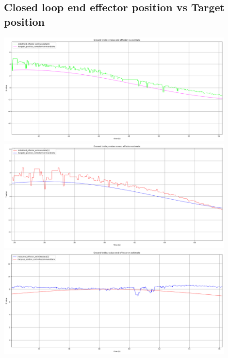 \subsection{Closed loop end effector position vs Target position}
\includegraphics[width=0.9\textwidth]{plots/closed_x.png} \\
\includegraphics[width=0.9\textwidth]{plots/closed_y.png} \\
\includegraphics[width=0.9\textwidth]{plots/closed_z.png}

